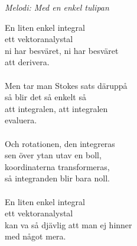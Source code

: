 {\footnotesize\textit{Melodi: Med en enkel tulipan}}\par
\vspace{10pt}
En liten enkel integral\\
ett vektoranalystal\\
ni har besväret, ni har besväret\\
att derivera.\\
\\
Men tar man Stokes sats däruppå\\
så blir det så enkelt så\\
att integralen, att integralen\\
evaluera.\\
\\
Och rotationen, den integreras\\
sen över ytan utav en boll,\\
koordinaterna transformeras,\\
så integranden blir bara noll.\\
\\
En liten enkel integral\\
ett vektoranalystal\\
kan va så djävlig att man ej hinner\\
med något mera.
